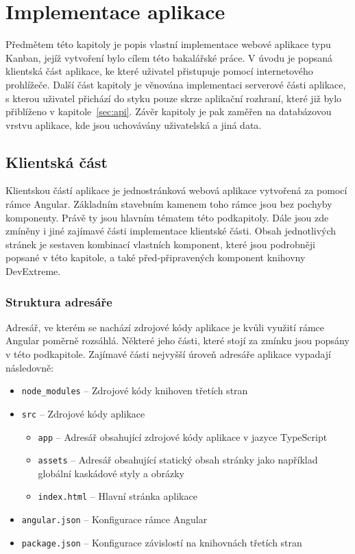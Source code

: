 \chapter{Implementace aplikace}
Předmětem této kapitoly je popis vlastní implementace webové aplikace typu Kanban, jejíž vytvoření bylo cílem této bakalářské práce. V úvodu je popsaná klientská část aplikace, ke které uživatel přistupuje pomocí internetového prohlížeče. Další část kapitoly je věnována implementaci serverové části aplikace, s kterou uživatel přichází do styku pouze skrze aplikační rozhraní, které již bylo přiblíženo v kapitole~\ref{sec:api}. Závěr kapitoly je pak zaměřen na databázovou vrstvu aplikace, kde jsou uchovávány uživatelská a jiná data.



\section{Klientská část}
Klientskou částí aplikace je jednostránková webová aplikace vytvořená za pomocí rámce Angular. Základním stavebním kamenem toho rámce jsou bez pochyby komponenty. Právě ty jsou hlavním tématem této podkapitoly. Dále jsou zde zmíněny i jiné zajímavé části implementace klientské části. Obsah jednotlivých stránek je sestaven kombinací vlastních komponent, které jsou podrobněji popsané v této kapitole, a také před-připravených komponent knihovny DevExtreme.


\subsection{Struktura adresáře}
Adresář, ve kterém se nachází zdrojové kódy aplikace je kvůli využití rámce Angular poměrně rozsáhlá. Některé jeho části, které stojí za zmínku jsou popsány v této podkapitole. Zajímavé části nejvyšší úroveň adresáře aplikace vypadají následovně:

\begin{itemize}
  \item \texttt{node\_modules} -- Zdrojové kódy knihoven třetích stran
  \item \texttt{src} -- Zdrojové kódy aplikace
  \begin{itemize}
    \item \texttt{app} -- Adresář obsahující zdrojové kódy aplikace v jazyce TypeScript
     \item \texttt{assets} -- Adresář obsahující statický obsah stránky jako například globální kaskádové styly a obrázky
     \item \texttt{index.html} -- Hlavní stránka aplikace
  \end{itemize}
  \item \texttt{angular.json} -- Konfigurace rámce Angular
  \item \texttt{package.json} -- Konfigurace závislostí na knihovnách třetích stran
\end{itemize}

